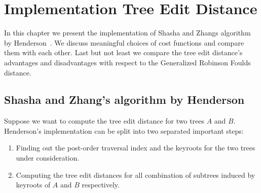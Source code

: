 \chapter{Implementation Tree Edit Distance}
In this chapter we present the implementation of Shasha and Zhangs algorithm by Henderson~\cite{Hen}. We discuss meaningful choices of cost functions and compare them with each other. Last but not least we compare the tree edit distance's advantages and disadvantages with respect to the Generalized Robinson Foulds distance. 

\section{Shasha and Zhang's algorithm by Henderson}
Suppose we want to compute the tree edit distance for two trees $A$ and $B$. Henderson's implementation can be split into two separated important steps:
\begin{enumerate}
\item Finding out the post-order traversal index and the keyroots for the two trees under consideration.
\item Computing the tree edit distances for all combination of subtrees induced by keyroots of $A$ and $B$ respectively.
\end{enumerate}

